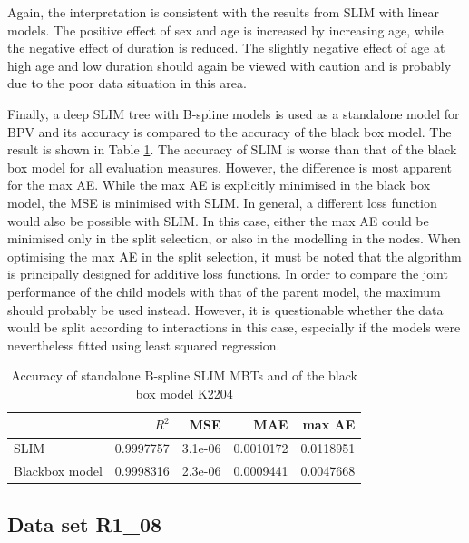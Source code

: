 Again, the interpretation is consistent with the results from SLIM with linear models. The positive effect of sex and age is increased by increasing age, while the negative effect of duration is reduced. The slightly negative effect of age at high age and low duration should again be viewed with caution and is probably due to the poor data situation in this area.


Finally, a deep SLIM tree with B-spline models is used as a standalone model for BPV and its accuracy is compared to the accuracy of the black box model. The result is shown in Table \ref{tab:ins_k2204_standalone_slim}.
The accuracy of SLIM is worse than that of the black box model for all evaluation measures. However, the difference is most apparent for the max AE. While the max AE is explicitly minimised in the black box model, the MSE is minimised with SLIM. In general, a different loss function would also be possible with SLIM. In this case, either the max AE could be minimised only in the split selection, or also in the modelling in the nodes. When optimising the max AE in the split selection, it must be noted that the algorithm is principally designed for additive loss functions. In order to compare the joint performance of the child models with that of the parent model, the maximum should probably be used instead. 
However, it is questionable whether the data would be split according to interactions in this case, especially if the models were nevertheless fitted using least squared regression.

\begin{table}[!htb]

\centering \scriptsize
\begin{tabular}[t]{l|r|r|r|r}
\hline
  & $R^2$ & MSE & MAE & max AE \\
\hline
SLIM & 0.9997757 & 3.1e-06 & 0.0010172 & 0.0118951\\
Blackbox model & 0.9998316 & 2.3e-06 & 0.0009441 & 0.0047668\\
\hline
\end{tabular}
\caption{Accuracy of standalone B-spline SLIM MBTs and of the black box model K2204}
\label{tab:ins_k2204_standalone_slim}
\end{table}








\subsection{Data set R1\_08}

